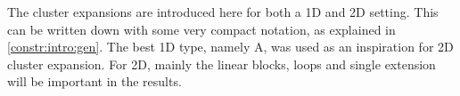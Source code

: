 The cluster expansions are introduced here for both a 1D and 2D setting. This can be written down with some very compact notation, as explained in \cref{constr:intro:gen}. The best 1D type, namely A, was used as an inspiration for 2D cluster expansion. For 2D, mainly the linear blocks, loops and single extension will be important in the results.